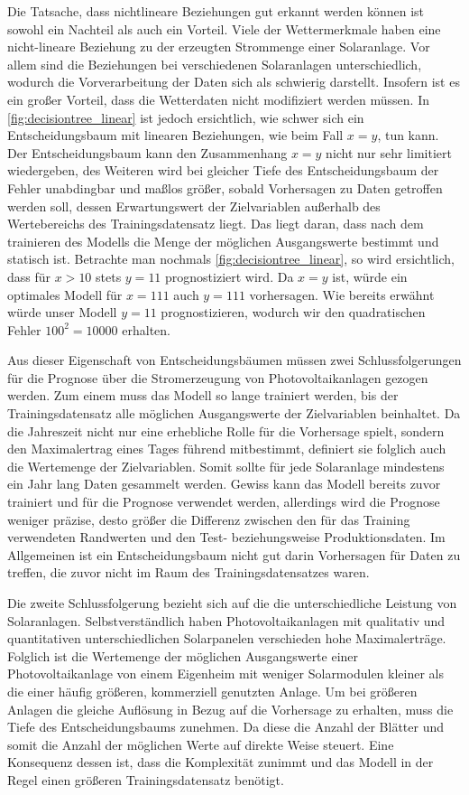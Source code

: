 \documentclass[12pt, a4paper]{article}
\begin{document}
Die Tatsache, dass nichtlineare Beziehungen gut erkannt werden können ist sowohl ein Nachteil als auch ein Vorteil. Viele der Wettermerkmale haben eine nicht-lineare Beziehung zu der erzeugten Strommenge einer Solaranlage. Vor allem sind die Beziehungen bei verschiedenen Solaranlagen unterschiedlich, wodurch die Vorverarbeitung der Daten sich als schwierig darstellt. Insofern ist es ein großer Vorteil, dass die Wetterdaten nicht modifiziert werden müssen. In \autoref{fig:decisiontree_linear} ist jedoch ersichtlich, wie schwer sich ein Entscheidungsbaum mit linearen Beziehungen, wie beim Fall $x=y$, tun kann. Der Entscheidungsbaum kann den Zusammenhang $x=y$ nicht nur sehr limitiert wiedergeben, des Weiteren wird bei gleicher Tiefe des Entscheidungsbaum der Fehler  unabdingbar und maßlos größer, sobald Vorhersagen zu Daten getroffen werden soll, dessen Erwartungswert der Zielvariablen außerhalb des Wertebereichs des Trainingsdatensatz liegt. Das liegt daran, dass nach dem trainieren des Modells die Menge der möglichen Ausgangswerte bestimmt und statisch ist. Betrachte man nochmals \autoref{fig:decisiontree_linear}, so wird ersichtlich, dass für $x>10$ stets $y=11$ prognostiziert wird. Da $x=y$ ist, würde ein optimales Modell für $x=111$ auch $y=111$ vorhersagen. Wie bereits erwähnt würde unser Modell $y=11$ prognostizieren, wodurch wir den quadratischen Fehler $100^{2}=10000$ erhalten. 

Aus dieser Eigenschaft von Entscheidungsbäumen müssen zwei Schlussfolgerungen für die Prognose über die Stromerzeugung von Photovoltaikanlagen gezogen werden. Zum einem muss das Modell so lange trainiert werden, bis der Trainingsdatensatz alle möglichen Ausgangswerte der Zielvariablen beinhaltet. Da die Jahreszeit nicht nur eine erhebliche Rolle für die Vorhersage spielt, sondern den Maximalertrag eines Tages führend mitbestimmt, definiert sie folglich auch die Wertemenge der Zielvariablen. Somit sollte für jede Solaranlage mindestens ein Jahr lang Daten gesammelt werden. Gewiss kann das Modell bereits zuvor trainiert und für die Prognose verwendet werden, allerdings wird die Prognose weniger präzise, desto größer die Differenz zwischen den für das Training verwendeten Randwerten und den Test- beziehungsweise Produktionsdaten. Im Allgemeinen ist ein Entscheidungsbaum nicht gut darin Vorhersagen für Daten zu treffen, die zuvor nicht im Raum des Trainingsdatensatzes waren.

Die zweite Schlussfolgerung bezieht sich auf die die unterschiedliche Leistung von Solaranlagen. Selbstverständlich haben Photovoltaikanlagen mit qualitativ und quantitativen unterschiedlichen Solarpanelen verschieden hohe Maximalerträge. Folglich ist die Wertemenge der möglichen Ausgangswerte einer Photovoltaikanlage von einem Eigenheim mit weniger Solarmodulen kleiner als die einer häufig größeren, kommerziell genutzten Anlage. Um bei größeren Anlagen die gleiche Auflösung in Bezug auf die Vorhersage zu erhalten, muss die Tiefe des Entscheidungsbaums zunehmen. Da diese die Anzahl der Blätter und somit die Anzahl der möglichen Werte auf direkte Weise steuert. Eine Konsequenz dessen ist, dass die Komplexität zunimmt und das Modell in der Regel einen größeren Trainingsdatensatz benötigt.
\end{document}
